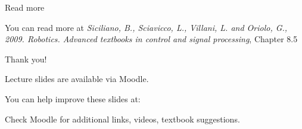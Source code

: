 \documentclass{beamer}
\begin{document}
\begin{frame}{Read more}
	\begin{flushleft}
		
		You can read more at \emph{ Siciliano, B., Sciavicco, L., Villani, L. and Oriolo, G., 2009. Robotics. Advanced textbooks in control and signal processing}, Chapter 8.5
		

\end{flushleft}
\end{frame}


\begin{frame}{Thank you!}
\centerline{Lecture slides are available via Moodle.}
\bigskip
\centerline{You can help improve these slides at:}
\centerline{\mygit}
\bigskip
\centerline{Check Moodle for additional links, videos, textbook suggestions.}
\bigskip

\centerline{\textcolor{black}{}}

\end{frame}
\end{document}
